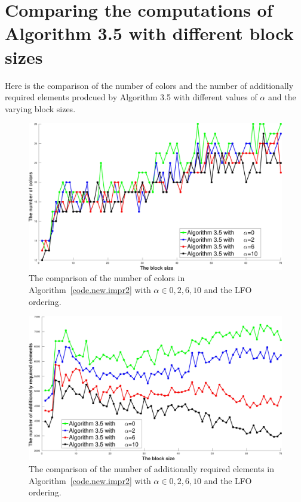 \documentclass[12pt, twoside,a4paper,toc=bibliography]{scrbook}
\newcommand{\coderef}[1]{Algorithm~\protect\ref{#1}}
\begin{document}
\clearpage
\section{Comparing the computations of Algorithm 3.5 with different block sizes}
\label{app.compare.alg35.alphas}
Here is the comparison of the number of colors and the number of additionally required elements
prodcued by Algorithm 3.5 with different values of $\alpha$ and the varying block sizes.

\begin{figure}
\centering
\includegraphics[width=0.9\linewidth]{ex33_alg35_alpha_0_2_6_10_bls_lfo_cols}
\caption{
The comparison of the number of colors in \coderef{code.new.impr2}
with $\alpha\in{0,2,6,10}$ and the LFO ordering.}
\label{ex33_alg35_alpha_0_2_6_10_bls_lfo_cols}
\end{figure}

\begin{figure}
\centering
\includegraphics[width=0.9\linewidth]{ex33_alg35_alpha_0_2_6_10_bls_lfo_adds}
\caption{
The comparison of the number of additionally required elements in \coderef{code.new.impr2}
with $\alpha\in{0,2,6,10}$ and the LFO ordering. }
\label{ex33_alg35_alpha_0_2_6_10_bls_lfo_adds}
\end{figure}
\end{document}
